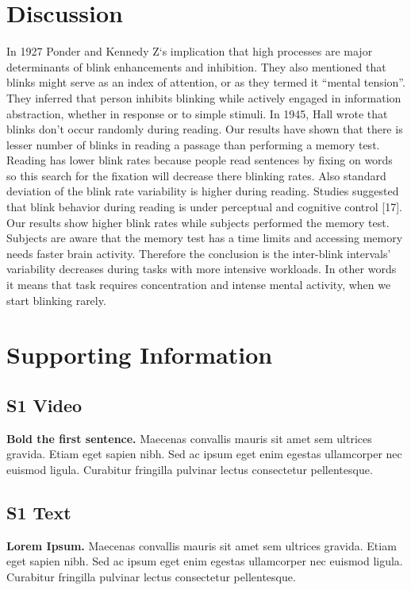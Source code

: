 \documentclass[10pt,letterpaper]{article}
\begin{document}
\section*{Discussion}
In 1927 Ponder and Kennedy Z‘s implication that high processes are major determinants of blink enhancements and inhibition. They also mentioned that blinks might serve as an index of attention, or as they termed it “mental tension”. They inferred that person inhibits blinking while actively engaged in information abstraction, whether in response or to simple stimuli. In 1945, Hall wrote that blinks don’t occur randomly during reading.  
Our results have shown that there is lesser number of blinks in reading a passage than performing a memory test. Reading has lower blink rates because people read sentences by fixing on words so this search for the fixation will decrease there blinking rates. Also standard deviation of the blink rate variability is higher during reading. Studies suggested that blink behavior during reading is under perceptual and cognitive control [17].  Our results show higher blink rates while subjects performed the memory test. Subjects are aware that the memory test has a time limits and accessing memory needs faster brain activity. Therefore the conclusion is the inter-blink intervals’ variability decreases during tasks with more intensive workloads. In other words it means that task requires concentration and intense mental activity, when we start blinking rarely.


\section*{Supporting Information}

\subsection*{S1 Video}
\label{S1_Video}
{\bf Bold the first sentence.}  Maecenas convallis mauris sit amet sem ultrices gravida. Etiam eget sapien nibh. Sed ac ipsum eget enim egestas ullamcorper nec euismod ligula. Curabitur fringilla pulvinar lectus consectetur pellentesque.

\subsection*{S1 Text}
\label{S1_Text}
{\bf Lorem Ipsum.} Maecenas convallis mauris sit amet sem ultrices gravida. Etiam eget sapien nibh. Sed ac ipsum eget enim egestas ullamcorper nec euismod ligula. Curabitur fringilla pulvinar lectus consectetur pellentesque.
\end{document}
